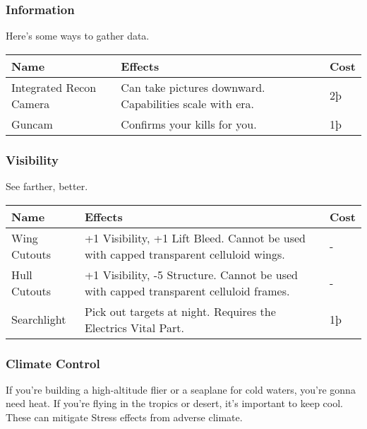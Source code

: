 \documentclass{article}
\begin{document}
\subsubsection{Information}
\label{_Information}

Here's some ways to gather data.

\begin{tabular}{|l|l|l|}
    \hline
    Name                    & Effects                                        & Cost \\\hline
    Integrated Recon Camera & Can take pictures downward. Capabilities scale
    with era.               & 2þ                                                    \\\hline
    Guncam                  & Confirms your kills for you.                   & 1þ   \\\hline
\end{tabular}

\subsubsection{Visibility}
\label{_Visibility}

See farther, better.

\begin{tabular}{|l|l|l|}
    \hline
    Name                          & Effects                                                  & Cost \\\hline
    Wing Cutouts                  & +1 Visibility, +1 Lift Bleed. Cannot be used with capped
    transparent celluloid wings.  & -                                                               \\\hline
    Hull Cutouts                  & +1 Visibility, -5 Structure. Cannot be used with capped
    transparent celluloid frames. & -                                                               \\\hline
    Searchlight                   & Pick out targets at night. Requires the Electrics Vital
    Part.                         & 1þ                                                              \\\hline
\end{tabular}

\subsubsection{Climate Control}
\label{_Climate_Control}

If you're building a high-altitude flier or a seaplane for cold waters,
you're gonna need heat. If you're flying in the tropics or desert, it's
important to keep cool. These can mitigate Stress effects from adverse
climate.
\end{document}
